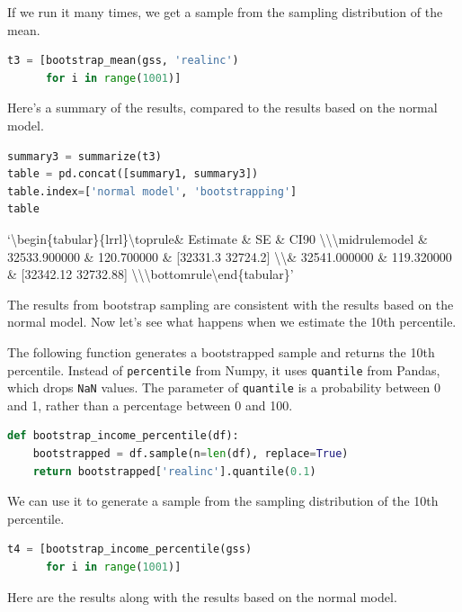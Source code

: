 If we run it many times, we get a sample from the sampling distribution
of the mean.

\begin{lstlisting}[language=Python,style=source]
t3 = [bootstrap_mean(gss, 'realinc')
      for i in range(1001)]
\end{lstlisting}

Here's a summary of the results, compared to the results based on the
normal model.

\begin{lstlisting}[language=Python,style=source]
summary3 = summarize(t3)
table = pd.concat([summary1, summary3])
table.index=['normal model', 'bootstrapping']
table
\end{lstlisting}

`\textbackslash begin\{tabular\}\{lrrl\}\n\textbackslash toprule\n \&
Estimate \& SE \& CI90
\textbackslash\textbackslash{}\n\textbackslash midrule\nnormal model \&
32533.900000 \& 120.700000 \& {[}32331.3 32724.2{]}
\textbackslash\textbackslash{}\nbootstrapping \& 32541.000000 \&
119.320000 \& {[}32342.12 32732.88{]}
\textbackslash\textbackslash{}\n\textbackslash bottomrule\n\textbackslash end\{tabular\}\n'

The results from bootstrap sampling are consistent with the results
based on the normal model. Now let's see what happens when we estimate
the 10th percentile.

The following function generates a bootstrapped sample and returns the
10th percentile. Instead of \passthrough{\lstinline!percentile!} from
Numpy, it uses \passthrough{\lstinline!quantile!} from Pandas, which
drops \passthrough{\lstinline!NaN!} values. The parameter of
\passthrough{\lstinline!quantile!} is a probability between 0 and 1,
rather than a percentage between 0 and 100.

\begin{lstlisting}[language=Python,style=source]
def bootstrap_income_percentile(df):
    bootstrapped = df.sample(n=len(df), replace=True)
    return bootstrapped['realinc'].quantile(0.1)
\end{lstlisting}

We can use it to generate a sample from the sampling distribution of the
10th percentile.

\begin{lstlisting}[language=Python,style=source]
t4 = [bootstrap_income_percentile(gss)
      for i in range(1001)]
\end{lstlisting}

Here are the results along with the results based on the normal model.

